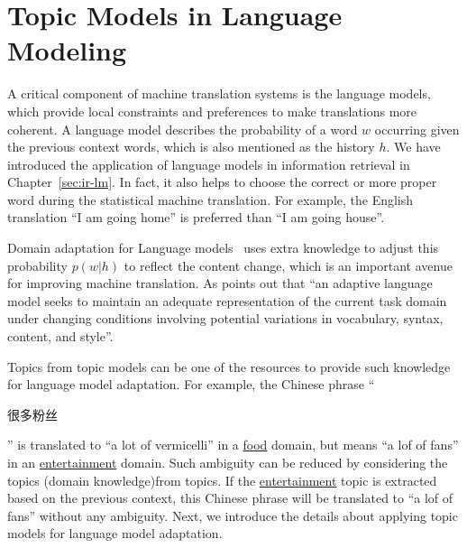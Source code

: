 

\section{Topic Models in Language Modeling}


A critical component of machine translation systems is the language
models, which provide local constraints and preferences to make
translations more coherent. A language model describes the probability
of a word $w$ occurring given the previous context words, which is
also mentioned as the history $h$. We have introduced the application
of language models in information retrieval in
Chapter~\ref{sec:ir-lm}. In fact, it also helps to choose the correct
or more proper word during the statistical machine translation. For
example, the English translation ``I am going home'' is preferred than
``I am going house''.

Domain adaptation for Language models~\citep{Bellegarda-04,wood-09}
uses extra knowledge to adjust this probability $p(w|h)$ to reflect
the content change, which is an important avenue for improving machine
translation. As \citet{Bellegarda-04} points out that ``an adaptive
language model seeks to maintain an adequate representation of the
current task domain under changing conditions involving potential
variations in vocabulary, syntax, content, and style''.

Topics from topic models can be one of the resources to provide such
knowledge for language model adaptation. For example, the Chinese
phrase ``\begin{CJK*}{UTF8}{gbsn}很多粉丝\end{CJK*}'' is translated to
  ``a lot of vermicelli'' in a \underline{food} domain, but means ``a
  lof of fans'' in an \underline{entertainment} domain. Such ambiguity
  can be reduced by considering the topics (domain knowledge)from
  topics. If the \underline{entertainment} topic is extracted based on
  the previous context, this Chinese phrase will be translated to ``a
  lof of fans'' without any ambiguity. Next, we introduce the details
  about applying topic models for language model adaptation.


